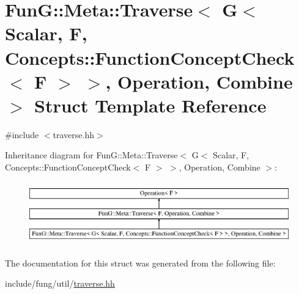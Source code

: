 \hypertarget{structFunG_1_1Meta_1_1Traverse_3_01G_3_01Scalar_00_01F_00_01Concepts_1_1FunctionConceptCheck_3_056d96032cb56cdcfc81b282c6fc44c83}{}\section{FunG\+:\+:Meta\+:\+:Traverse$<$ G$<$ Scalar, F, Concepts\+:\+:Function\+Concept\+Check$<$ F $>$ $>$, Operation, Combine $>$ Struct Template Reference}
\label{structFunG_1_1Meta_1_1Traverse_3_01G_3_01Scalar_00_01F_00_01Concepts_1_1FunctionConceptCheck_3_056d96032cb56cdcfc81b282c6fc44c83}


{\ttfamily \#include $<$traverse.\+hh$>$}

Inheritance diagram for FunG\+:\+:Meta\+:\+:Traverse$<$ G$<$ Scalar, F, Concepts\+:\+:Function\+Concept\+Check$<$ F $>$ $>$, Operation, Combine $>$\+:\begin{figure}[H]
\begin{center}
\leavevmode
\includegraphics[height=2.763158cm]{structFunG_1_1Meta_1_1Traverse_3_01G_3_01Scalar_00_01F_00_01Concepts_1_1FunctionConceptCheck_3_056d96032cb56cdcfc81b282c6fc44c83}
\end{center}
\end{figure}


The documentation for this struct was generated from the following file\+:\begin{DoxyCompactItemize}
\item 
include/fung/util/\hyperlink{traverse_8hh}{traverse.\+hh}\end{DoxyCompactItemize}
